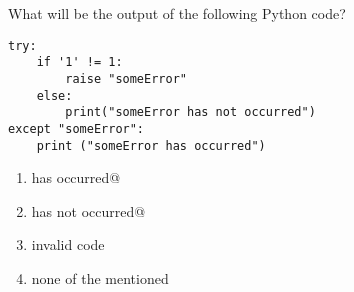 \question
What will be the output of the following Python code?
\begin{lstlisting}
try:
    if '1' != 1:
        raise "someError"
    else:
        print("someError has not occurred")
except "someError":
    print ("someError has occurred")
\end{lstlisting}
\begin{enumerate}
\item \lstinline@someError has occurred@
\item \lstinline@someError has not occurred@
\item invalid code
\item none of the mentioned
\end{enumerate}

